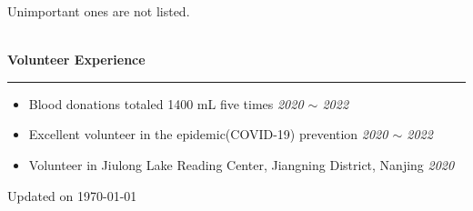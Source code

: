 \documentclass[12pt]{article}
\newcommand{\sect}[1]{
    ~\\ \noindent \textbf{#1} \medskip \hrule \medskip
}
\begin{document}
\hfill {\tiny Unimportant ones are not listed.}


\sect{Volunteer Experience}

\begin{itemize}[noitemsep,nolistsep]
    \item Blood donations totaled 1400 mL five times \hfill \textit{2020 $\sim$ 2022}
    \item Excellent volunteer in the epidemic(COVID-19) prevention \hfill \textit{2020 $\sim$ 2022}
    \item Volunteer in Jiulong Lake Reading Center, Jiangning District, Nanjing \hfill \textit{2020}
\end{itemize}

\hfill {\tiny Updated on \today}
\end{document}
